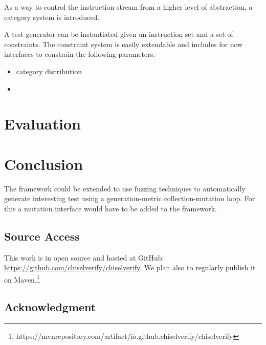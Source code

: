 \documentclass[conference]{IEEEtran}
\begin{document}



As a way to control the instruction stream from a higher level of abstraction, a category system is introduced.

A test generator can be instantiated given an instruction set and a set of constraints. The constraint 
system is easily extendable and includes for now interfaces to constrain the following parameters:
\begin{itemize}
    \item category distribution
    \item 
\end{itemize}


\section{Evaluation}






\section{Conclusion}
The framework could be extended to use fuzzing techniques to automatically generate interesting test using a generation-metric collection-mutation loop. For this a mutation interface would have to be added to the framework.

\subsection*{Source Access}

This work is in open source and hosted at GitHub:\\ \url{https://github.com/chiselverify/chiselverify}.
We plan also to regularly publish it on Maven.\footnote{https://mvnrepository.com/artifact/io.github.chiselverify/chiselverify}

\subsection*{Acknowledgment}



\end{document}
